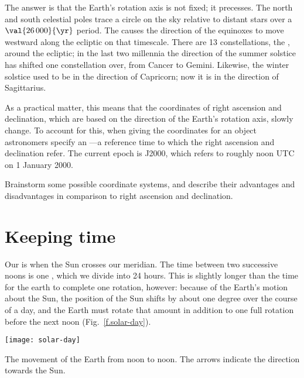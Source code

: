The answer is that the Earth's rotation axis is not fixed; it precesses. The north and south celestial poles trace a circle on the sky relative to distant stars over a $\val{26\,000}{\yr}$ period. The causes the direction of the equinoxes to move westward along the ecliptic on that timescale. There are 13 constellations, the , around the ecliptic; in the last two millennia the direction of the summer solstice has shifted one constellation over, from Cancer to Gemini. Likewise, the winter solstice used to be in the direction of Capricorn; now it is in the direction of Sagittarius.

As a practical matter, this means that the coordinates of right ascension and declination, which are based on the direction of the Earth's rotation axis, slowly change. To account for this, when giving the coordinates for an object astronomers specify an ---a reference time to which the right ascension and declination refer. The current epoch is J2000, which refers to roughly noon UTC on 1 January 2000.

\begin{exercisebox}
Brainstorm some possible coordinate systems, and describe their advantages and disadvantages in comparison to right ascension and declination.
\end{exercisebox}

\section{Keeping time}

Our  is when the Sun crosses our meridian. The time between two successive noons is one , which we divide into 24 hours. This is slightly longer than the time for the earth to complete one rotation, however: because of the Earth's motion about the Sun, the position of the Sun shifts by about one degree over the course of a day, and the Earth must rotate that amount in addition to one full rotation before the next noon (Fig.~\ref{f.solar-day}).

\begin{marginfigure}
\texttt{[image: solar-day]}
\caption[The movement of the Earth from noon to noon]{The movement of the Earth from noon to noon.  The arrows indicate the direction towards the Sun.}
\label{f.solar-day}
\end{marginfigure}

